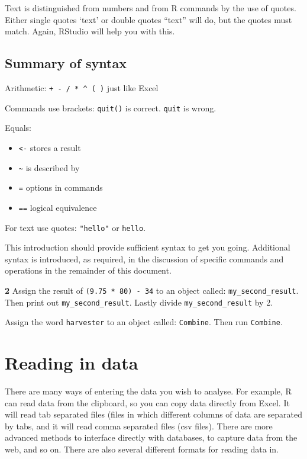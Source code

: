 \documentclass[
]{book}
\makeatletter
\providecommand{\tightlist}{%
  \setlength{\itemsep}{0pt}\setlength{\parskip}{0pt}}
\newenvironment{kframe}{%
\medskip{}
\setlength{\fboxsep}{.8em}
 \def\at@end@of@kframe{}%
 \ifinner\ifhmode%
  \def\at@end@of@kframe{\end{minipage}}%
  \begin{minipage}{\columnwidth}%
 \fi\fi%
 \def\FrameCommand##1{\hskip\@totalleftmargin \hskip-\fboxsep
 \colorbox{shadecolor}{##1}\hskip-\fboxsep
     \hskip-\linewidth \hskip-\@totalleftmargin \hskip\columnwidth}%
 \MakeFramed {\advance\hsize-\width
   \@totalleftmargin\z@ \linewidth\hsize
   \@setminipage}}%
 {\par\unskip\endMakeFramed%
 \at@end@of@kframe}
\newenvironment{rmdblock}[1]
  {
  \begin{itemize}
  \renewcommand{\labelitemi}{
    \raisebox{-.7\height}[0pt][0pt]{
      {\setkeys{Gin}{width=3em,keepaspectratio}\texttt{[image: images/\#1]}}
    }
  }
  \setlength{\fboxsep}{1em}
  \begin{kframe}
  \item
  }
  {
  \end{kframe}
  \end{itemize}
  }
\newenvironment{rmdquiz}
  {\begin{rmdblock}{quiz}}
  {\end{rmdblock}}
\makeatother
\begin{document}
Text is distinguished from numbers and from R commands by the use of quotes. Either single quotes `text' or double quotes ``text'' will do, but the quotes must match. Again, RStudio will help you with this.

\hypertarget{summary-of-syntax}{%
\subsection{Summary of syntax}\label{summary-of-syntax}}

Arithmetic: \texttt{+\ -\ /\ *\ \^{}\ (\ )} just like Excel

Commands use brackets: \texttt{quit()} is correct. \texttt{quit} is wrong.

Equals:

\begin{itemize}
\tightlist
\item
  \texttt{\textless{}-} stores a result
\item
  \texttt{\textasciitilde{}} is described by
\item
  \texttt{=} options in commands
\item
  \texttt{==} logical equivalence
\end{itemize}

For text use quotes: \texttt{"hello"} or \texttt{\textquotesingle{}hello\textquotesingle{}}.

This introduction should provide sufficient syntax to get you going. Additional syntax is introduced, as required, in the discussion of specific commands and operations in the remainder of this document.

\begin{rmdquiz}
\textbf{2} Assign the result of \texttt{(9.75\ *\ 80)\ -\ 34} to an object called: \texttt{my\_second\_result}. Then print out \texttt{my\_second\_result}. Lastly divide \texttt{my\_second\_result} by 2.

Assign the word \texttt{harvester} to an object called: \texttt{Combine}. Then run \texttt{Combine}.
\end{rmdquiz}

\hypertarget{reading-in-data}{%
\section{Reading in data}\label{reading-in-data}}

There are many ways of entering the data you wish to analyse. For example, R can read data from the clipboard, so you can copy data directly from Excel. It will read tab separated files (files in which different columns of data are separated by tabs, and it will read comma separated files (csv files). There are more advanced methods to interface directly with databases, to capture data from the web, and so on. There are also several different formats for reading data in.
\end{document}
